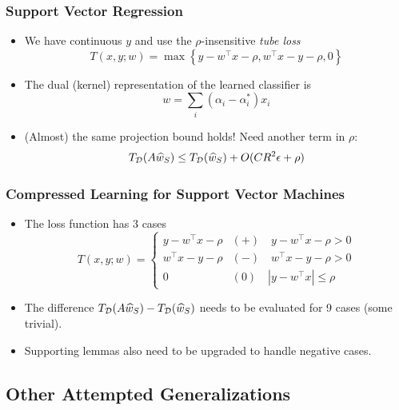 \documentclass[aspectratio=34]{beamer}
\theoremstyle{plain}
\begin{document}
\begin{frame}
\frametitle{Support Vector Regression}
\begin{itemize}
    \item We have continuous $y$ and use the $\rho$-insensitive \emph{tube loss}
    \[
    T(x,y;w)=\max\left\{ y-w^{\top}x-\rho,w^{\top}x-y-\rho,0\right\} \label{eq:epsilon-insensitive}
    \]
    \item The dual (kernel) representation of the learned classifier is
    \[
    w=\sum_{i}\left(\alpha_{i}-\alpha_{i}^{*}\right)x_{i}\label{eq:dual-w}
    \]
\item (Almost) the same projection bound holds! Need another term in $\rho$:
    \[
    T_{{\cal D}}(A\widehat{w}_{S})\leq T_{{\cal D}}(\widehat{w}_{S})+O(CR^{2}\epsilon + \rho)\label{eq:dist-T-bound}
    \]
\end{itemize}
\end{frame}

\begin{frame}
    \frametitle{Compressed Learning for Support Vector Machines}
    \begin{itemize}
        \item The loss function has 3 cases
        \[
        T(x,y;w)=\begin{cases}
        y-w^{\top}x-\rho & (+)\quad y-w^{\top}x-\rho>0\\
        w^{\top}x-y-\rho & (-)\quad w^{\top}x-y-\rho>0\\
        0 & (0)\quad\left|y-w^{\top}x\right|\leq\rho
        \end{cases}
        \]
        \item The difference $T_{{\cal D}}(A\widehat{w}_{S}) - T_{{\cal D}}(\widehat{w}_{S})$ needs to be evaluated for 9 cases (some trivial).
        \item Supporting lemmas also need to be upgraded to handle negative cases.
    \end{itemize}
\end{frame}

\subsection{Other Attempted Generalizations}
\end{document}
